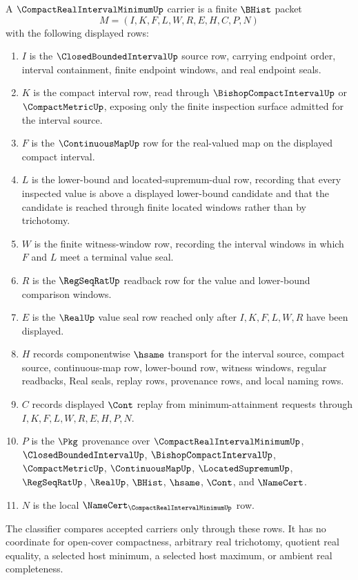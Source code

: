 \begin{definition}
\label{def:compact-real-interval-minimum-carrier}
A $\CompactRealIntervalMinimumUp$ carrier is a finite $\BHist$ packet
$$
M=(I,K,F,L,W,R,E,H,C,P,N)
$$
with the following displayed rows:
\begin{enumerate}
\item $I$ is the $\ClosedBoundedIntervalUp$ source row, carrying endpoint order, interval containment, finite endpoint windows, and real endpoint seals.
\item $K$ is the compact interval row, read through $\BishopCompactIntervalUp$ or $\CompactMetricUp$, exposing only the finite inspection surface admitted for the interval source.
\item $F$ is the $\ContinuousMapUp$ row for the real-valued map on the displayed compact interval.
\item $L$ is the lower-bound and located-supremum-dual row, recording that every inspected value is above a displayed lower-bound candidate and that the candidate is reached through finite located windows rather than by trichotomy.
\item $W$ is the finite witness-window row, recording the interval windows in which $F$ and $L$ meet a terminal value seal.
\item $R$ is the $\RegSeqRatUp$ readback row for the value and lower-bound comparison windows.
\item $E$ is the $\RealUp$ value seal row reached only after $I,K,F,L,W,R$ have been displayed.
\item $H$ records componentwise $\hsame$ transport for the interval source, compact source, continuous-map row, lower-bound row, witness windows, regular readbacks, Real seals, replay rows, provenance rows, and local naming rows.
\item $C$ records displayed $\Cont$ replay from minimum-attainment requests through $I,K,F,L,W,R,E,H,P,N$.
\item $P$ is the $\Pkg$ provenance over $\CompactRealIntervalMinimumUp$, $\ClosedBoundedIntervalUp$, $\BishopCompactIntervalUp$, $\CompactMetricUp$, $\ContinuousMapUp$, $\LocatedSupremumUp$, $\RegSeqRatUp$, $\RealUp$, $\BHist$, $\hsame$, $\Cont$, and $\NameCert$.
\item $N$ is the local $\NameCert_{\CompactRealIntervalMinimumUp}$ row.
\end{enumerate}
The classifier compares accepted carriers only through these rows. It has no coordinate for open-cover compactness, arbitrary real trichotomy, quotient real equality, a selected host minimum, a selected host maximum, or ambient real completeness.
\end{definition}

